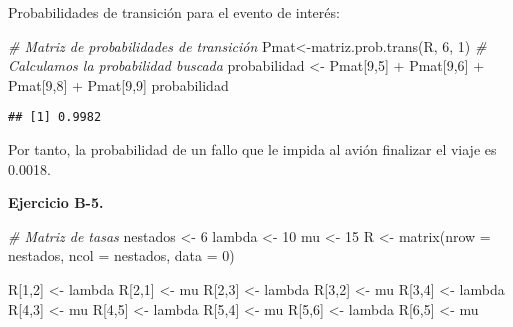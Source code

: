 \documentclass[
]{book}
\newenvironment{Shaded}{\begin{snugshade}}{\end{snugshade}}
\newcommand{\AttributeTok}[1]{\textcolor[rgb]{0.77,0.63,0.00}{#1}}
\newcommand{\CommentTok}[1]{\textcolor[rgb]{0.56,0.35,0.01}{\textit{#1}}}
\newcommand{\DecValTok}[1]{\textcolor[rgb]{0.00,0.00,0.81}{#1}}
\newcommand{\FunctionTok}[1]{\textcolor[rgb]{0.00,0.00,0.00}{#1}}
\newcommand{\NormalTok}[1]{#1}
\newcommand{\OtherTok}[1]{\textcolor[rgb]{0.56,0.35,0.01}{#1}}
\newcommand{\SpecialCharTok}[1]{\textcolor[rgb]{0.00,0.00,0.00}{#1}}
\theoremstyle{definition}
\theoremstyle{definition}
\theoremstyle{definition}
\theoremstyle{definition}
\theoremstyle{remark}
\begin{document}
Probabilidades de transición para el evento de interés:

\begin{Shaded}
\begin{Highlighting}[]
\CommentTok{\# Matriz de probabilidades de transición}
\NormalTok{Pmat}\OtherTok{\textless{}{-}}\FunctionTok{matriz.prob.trans}\NormalTok{(R, }\DecValTok{6}\NormalTok{, }\DecValTok{1}\NormalTok{)}
\CommentTok{\# Calculamos la probabilidad buscada}
\NormalTok{probabilidad }\OtherTok{\textless{}{-}}\NormalTok{ Pmat[}\DecValTok{9}\NormalTok{,}\DecValTok{5}\NormalTok{] }\SpecialCharTok{+}\NormalTok{ Pmat[}\DecValTok{9}\NormalTok{,}\DecValTok{6}\NormalTok{] }\SpecialCharTok{+}\NormalTok{ Pmat[}\DecValTok{9}\NormalTok{,}\DecValTok{8}\NormalTok{] }\SpecialCharTok{+}\NormalTok{ Pmat[}\DecValTok{9}\NormalTok{,}\DecValTok{9}\NormalTok{]}
\NormalTok{probabilidad}
\end{Highlighting}
\end{Shaded}

\begin{verbatim}
## [1] 0.9982
\end{verbatim}

Por tanto, la probabilidad de un fallo que le impida al avión finalizar el viaje es 0.0018.

\textbf{Ejercicio B-5.}

\begin{Shaded}
\begin{Highlighting}[]
\CommentTok{\# Matriz de tasas}
\NormalTok{nestados }\OtherTok{\textless{}{-}} \DecValTok{6}
\NormalTok{lambda }\OtherTok{\textless{}{-}} \DecValTok{10}
\NormalTok{mu }\OtherTok{\textless{}{-}} \DecValTok{15}
\NormalTok{R }\OtherTok{\textless{}{-}} \FunctionTok{matrix}\NormalTok{(}\AttributeTok{nrow =}\NormalTok{ nestados, }\AttributeTok{ncol =}\NormalTok{ nestados, }\AttributeTok{data =} \DecValTok{0}\NormalTok{)}

\NormalTok{R[}\DecValTok{1}\NormalTok{,}\DecValTok{2}\NormalTok{] }\OtherTok{\textless{}{-}}\NormalTok{ lambda }
\NormalTok{R[}\DecValTok{2}\NormalTok{,}\DecValTok{1}\NormalTok{] }\OtherTok{\textless{}{-}}\NormalTok{ mu}
\NormalTok{R[}\DecValTok{2}\NormalTok{,}\DecValTok{3}\NormalTok{] }\OtherTok{\textless{}{-}}\NormalTok{ lambda }
\NormalTok{R[}\DecValTok{3}\NormalTok{,}\DecValTok{2}\NormalTok{] }\OtherTok{\textless{}{-}}\NormalTok{ mu}
\NormalTok{R[}\DecValTok{3}\NormalTok{,}\DecValTok{4}\NormalTok{] }\OtherTok{\textless{}{-}}\NormalTok{ lambda}
\NormalTok{R[}\DecValTok{4}\NormalTok{,}\DecValTok{3}\NormalTok{] }\OtherTok{\textless{}{-}}\NormalTok{ mu}
\NormalTok{R[}\DecValTok{4}\NormalTok{,}\DecValTok{5}\NormalTok{] }\OtherTok{\textless{}{-}}\NormalTok{ lambda}
\NormalTok{R[}\DecValTok{5}\NormalTok{,}\DecValTok{4}\NormalTok{] }\OtherTok{\textless{}{-}}\NormalTok{ mu}
\NormalTok{R[}\DecValTok{5}\NormalTok{,}\DecValTok{6}\NormalTok{] }\OtherTok{\textless{}{-}}\NormalTok{ lambda}
\NormalTok{R[}\DecValTok{6}\NormalTok{,}\DecValTok{5}\NormalTok{] }\OtherTok{\textless{}{-}}\NormalTok{ mu}
\end{Highlighting}
\end{Shaded}
\end{document}
